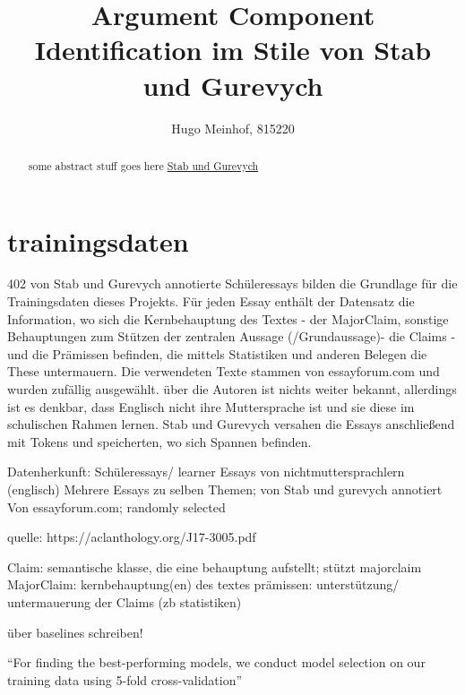 \documentclass[12]{article}
\title{Argument Component Identification im Stile von Stab und Gurevych}
\author{Hugo Meinhof, 815220}
\theoremstyle{mytheoremstyle}
\theoremstyle{mytheoremstyle}
\theoremstyle{myproblemstyle}
\begin{document}
  \maketitle
  \begin{abstract}
  some abstract stuff goes here \href{https://aclanthology.org/J17-3005/}{Stab und Gurevych}
  \end{abstract}
  \section*{trainingsdaten}
  402 von Stab und Gurevych annotierte Schüleressays bilden die Grundlage für die Trainingsdaten dieses Projekts. Für jeden Essay enthält der Datensatz die Information, wo sich die Kernbehauptung des Textes - der MajorClaim, sonstige Behauptungen zum Stützen der zentralen Aussage (/Grundaussage)- die Claims - und die Prämissen befinden, die mittels Statistiken und anderen Belegen die These untermauern. 
  Die verwendeten Texte stammen von essayforum.com und wurden zufällig ausgewählt. über die Autoren ist nichts weiter bekannt, allerdings ist es denkbar, dass Englisch nicht ihre Muttersprache ist und sie diese im schulischen Rahmen lernen.
  Stab und Gurevych versahen die Essays anschließend mit Tokens und speicherten, wo sich Spannen befinden. 


  Datenherkunft: Schüleressays/ learner Essays von nichtmuttersprachlern (englisch)
  Mehrere Essays zu selben Themen; von Stab und gurevych annotiert
  Von essayforum.com; randomly selected 

  quelle: https://aclanthology.org/J17-3005.pdf

  Claim: semantische klasse, die eine behauptung aufstellt; stützt majorclaim 
  MajorClaim: kernbehauptung(en) des textes 
  prämissen: unterstützung/ untermauerung der Claims (zb statistiken) 

  über baselines schreiben!

  ``For finding the best-performing models, we conduct model selection on our training data using 5-fold cross-validation''
\end{document}
